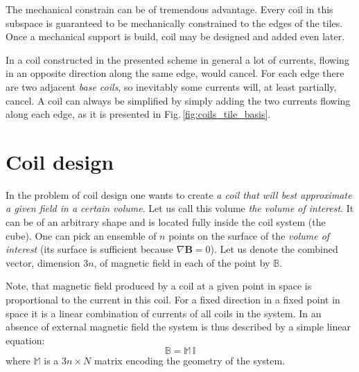 The mechanical constrain can be of tremendous advantage. Every coil in this subspace is guaranteed to be mechanically constrained to the edges of the tiles. Once a mechanical support is build, coil may be designed and added even later.

In a coil constructed in the presented scheme in general a lot of currents, flowing in an opposite direction along the same edge, would cancel. For each edge there are two adjacent \emph{base coils}, so inevitably some currents will, at least partially, cancel. A coil can always be simplified by simply adding the two currents flowing along each edge, as it is presented in Fig.\,\ref{fig:coils_tile_basis}.


\section{Coil design}
In the problem of coil design one wants to create \emph{a coil that will best approximate a given field in a certain volume}. Let us call this volume \emph{the volume of interest}. It can be of an arbitrary shape and is located fully inside the coil system (the cube). One can pick an ensemble of $n$ points on the surface of the \emph{volume of interest} (its surface is sufficient because $\nabla \mathbf{B} = 0$). Let us denote the combined vector, dimension $3n$, of magnetic field in each of the point by $\mathbb{B}$.


Note, that magnetic field produced by a coil at a given point in space is proportional to the current in this coil. For a fixed direction in a fixed point in space it is a linear combination of currents of all coils in the system. In an absence of external magnetic field the system is thus described by a simple linear equation:
\begin{equation}
  \mathbb{B} = \mathbb{M} \, \mathbb{I}
\end{equation}
where $\mathbb{M}$ is a $3n \times N$ matrix encoding the geometry of the system.

